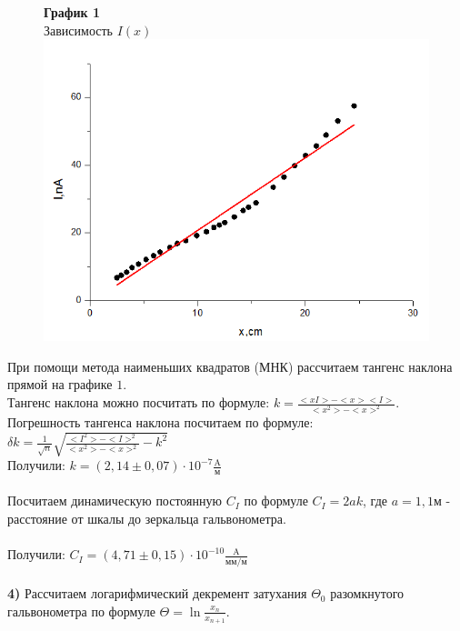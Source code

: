\documentclass[11pt,a4paper]{article}
\begin{document}
\begin{figure}[h!]
		\centering
		\textbf{График 1}\\
	Зависимость $I(x)$
	\\

	\includegraphics[width=0.7\linewidth]{20}

\end{figure}
При помощи метода наименьших квадратов (МНК) рассчитаем тангенс наклона прямой на графике $1$. 
\\
Тангенс наклона можно посчитать по формуле: $k = \frac {<xI> - <x><I>}{<x^2> - <x>^2}$.
\\
Погрешность тангенса наклона посчитаем по формуле: $\delta k = \frac{1}{\sqrt{n}} \sqrt{\frac{<I^2> - <I>^2}{<x^2> - <x>^2} - k^2}$
\\
Получили: $k = (2,14 \pm 0,07) \cdot 10^{-7} \frac{\text{A}}{\text{м}}$ \\\\
Посчитаем динамическую постоянную $C_I$ по формуле $C_I = 2ak$, где $a = 1,1  \text{м}$ - расстояние от шкалы до зеркальца гальвонометра.
\\\\
Получили: $\boxed {C_I = (4,71 \pm 0,15) \cdot 10^{-10} \frac{\text{A}}{\text{мм} / \text{м}}}$
\\\\
\textbf{4)} Рассчитаем логарифмический декремент затухания $\Theta_0$ разомкнутого гальвонометра по формуле $\Theta = \ln \frac{x_n}{x_{n+1}}$.
\\
\end{document}
